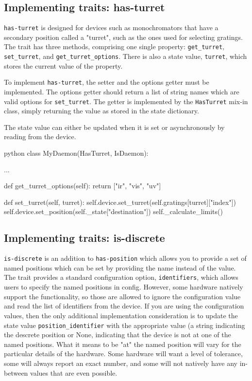 \subsection{Implementing traits: has-turret}

\texttt{has-turret} is designed for devices such as monochromators that have a secondary position called a "turret", such as the ones used for selecting gratings.
The trait has three methods, comprising one single \yaq{} property: \texttt{get\_turret}, \texttt{set\_turret}, and \texttt{get\_turret\_options}.
There is also a state value, \texttt{turret}, which stores the current value of the property.

To implement \texttt{has-turret}, the setter and the options getter must be implemented.
The options getter should return a list of string names which are valid options for \texttt{set\_turret}.
The getter is implemented by the \texttt{HasTurret} mix-in class, simply returning the value as stored in the state dictionary.

The state value can either be updated when it is set or asynchronously by reading from the device.

\begin{codefragment}{python}
class MyDaemon(HasTurret, IsDaemon):

    ...

    def get_turret_options(self):
	return ["ir", "vis", "uv"]

    def set_turret(self, turret):
    	self.device.set_turret(self.gratings[turret]["index"])
	self.device.set_position(self._state["destination"])
	self._calculate_limits()
\end{codefragment}

\subsection{Implementing traits: is-discrete}

\texttt{is-discrete} is an addition to \texttt{has-position} which allows you to provide a set of named positions which can be set by providing the name instead of the value.
The trait provides a standard configuration option, \texttt{identifiers}, which allows users to specify the named positions in config.
However, some hardware natively support the functionality, so those are allowed to ignore the configuration value and read the list of identifiers from the device.
If you are using the configuration values, then the only additional implementation consideration is to update the state value \texttt{position\_identifier} with the appropriate value (a string indicating the descrete position or None, indicating that the device is not at one of the named positions.
What it means to be "at" the named position will vary for the particular details of the hardware.
Some hardware will want a level of tolerance, some will always report an exact number, and some will not natively have any in-between values that are even possible.

